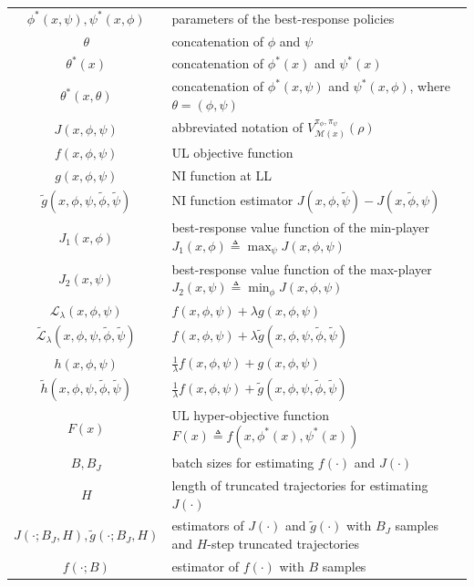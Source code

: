 \documentclass{article}
\theoremstyle{plain}
\theoremstyle{definition}
\theoremstyle{remark}
\def\cM{\mathcal M}
\def\cL{\mathcal L}
\def\bydef{\triangleq}
\begin{document}
\begin{table}[!htbp]
\begin{center}
\begin{small}
\begin{threeparttable}
\begin{tabular}{cl}
            $\phi^*(x,\psi),\psi^*(x,\phi)$ & parameters of the best-response policies \\
            $\theta$ & concatenation of $\phi$ and $\psi$ \\
            $\theta^*(x)$ & concatenation of $\phi^*(x)$ and $\psi^*(x)$ \\
            $\theta^*(x,\theta)$ & concatenation of $\phi^*(x,\psi)$ and $\psi^*(x,\phi)$, where $\theta = (\phi,\psi)$ \\
            $J(x,\phi,\psi)$ & abbreviated notation of $V^{\pi_\phi,\pi_\psi}_{\cM(x)}(\rho)$ \\
            $f(x,\phi,\psi)$ & UL objective function \\
            $g(x,\phi,\psi)$ & NI function at LL \\
            $\tilde{g}(x,\phi,\psi,\tilde{\phi},\tilde{\psi})$ & NI function estimator  $J(x,\phi,\tilde{\psi}) - J(x,\tilde{\phi},\psi)$ \\
            $J_1(x,\phi)$ & best-response value function of the min-player $J_1(x,\phi) \bydef \max_\psi J(x,\phi,\psi)$  \\
            $J_2(x,\psi)$ & best-response value function of the max-player $J_2(x,\psi) \bydef \min_\phi J(x,\phi,\psi)$ \\
            $\cL_\lambda(x,\phi,\psi)$ & $f(x,\phi,\psi) + \lambda g(x,\phi,\psi)$ \\ 
            $\tilde{\cL}_\lambda(x,\phi,\psi,\tilde{\phi},\tilde{\psi})$ & $f(x,\phi,\psi) + \lambda \tilde{g}(x,\phi,\psi,\tilde{\phi},\tilde{\psi})$ \\
            $h(x,\phi,\psi)$ & $\frac{1}{\lambda} f(x,\phi,\psi) + g(x,\phi,\psi)$\\
            $\tilde{h}(x,\phi,\psi,\tilde{\phi},\tilde{\psi})$ & $\frac{1}{\lambda} f(x,\phi,\psi) + \tilde{g}(x,\phi,\psi,\tilde{\phi},\tilde{\psi})$ \\
            $F(x)$ &  UL hyper-objective function $F(x) \bydef f(x,\phi^*(x),\psi^*(x))$\\
            $B, B_J$ &  batch sizes for estimating $f(\cdot)$ and $J(\cdot)$ \\
            $H$ & length of truncated trajectories for estimating $J(\cdot)$ \\
            $J(\cdot;B_J,H),\tilde{g}(\cdot;B_J,H)$ & estimators of $J(\cdot)$ and $\tilde{g}(\cdot)$ with $B_J$ samples and $H$-step truncated trajectories \\
            $f(\cdot;B)$ & estimator of $f(\cdot)$ with $B$ samples \\

\end{tabular}
\end{threeparttable}
\end{small}
\end{center}
\end{table}
\end{document}
